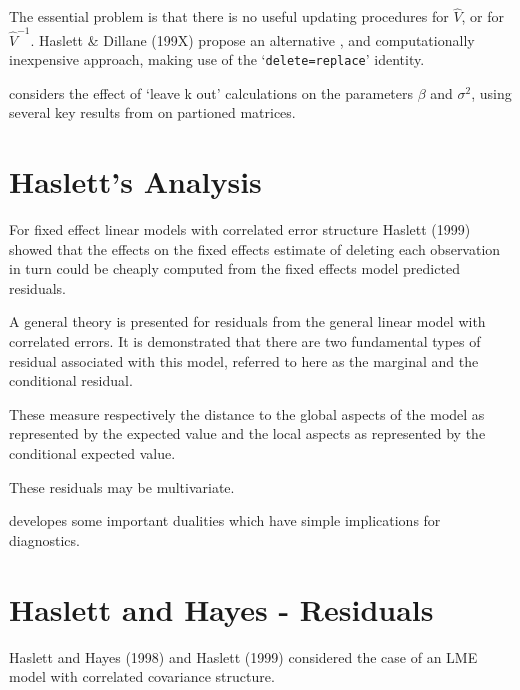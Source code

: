 \documentclass[12pt, a4paper]{article}
\begin{document}
	
	The essential problem is that there is no
	useful updating procedures for $\hat{V}$, or for $\hat{V}^{-1}$.
	Haslett \& Dillane (199X) propose an alternative , and
	computationally inexpensive approach, making use of the
	`\texttt{delete=replace}' identity.
	
	\citet{Haslett99} considers the effect of `leave k out'
	calculations on the parameters $\beta$ and $\sigma^{2}$, using
	several key results from \citet{HaslettHayes} on partioned
	matrices.




\section{Haslett's Analysis} %
For fixed effect linear models with correlated error structure Haslett (1999) showed that the effects on
the fixed effects estimate of deleting each observation in turn could be cheaply computed from the fixed effects model predicted residuals.



A general theory is presented for residuals from the general linear model with correlated errors. 
It is demonstrated that there are two fundamental types of residual associated with this model, 
referred to here as the marginal and the conditional residual. 

These measure respectively the distance to the global aspects of the model as represented by the expected value 
and the local aspects as represented by the conditional expected value. 

These residuals may be multivariate. 

\citet{HaslettHayes} developes some important dualities which have simple implications for diagnostics. 



\section*{Haslett and Hayes - Residuals}
Haslett and Hayes (1998) and Haslett (1999) considered the case of an LME model with correlated covariance structure.

\newpage
\end{document}
